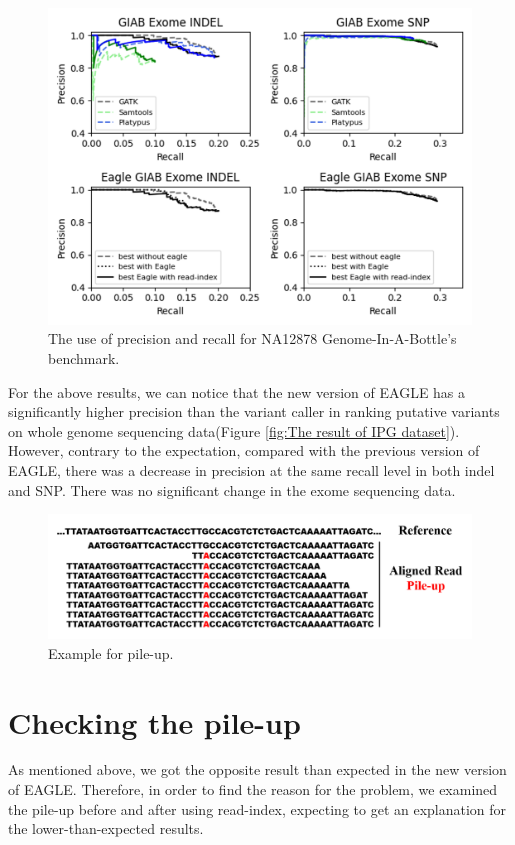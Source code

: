 \documentclass[PhD]{PHlab-thesis}
\begin{document}
\begin{figure}[h!]
	\centering
	\includegraphics[scale=0.45]{figures/GIAB result.png}
	\caption{The use of precision and recall for NA12878 Genome-In-A-Bottle’s benchmark.}
	\label{fig:The result of GIAB dataset} %
\end{figure}

For the above results, we can notice that the new version of EAGLE has a significantly higher precision than the variant caller in ranking putative variants on whole genome sequencing data(Figure \ref{fig:The result of IPG dataset}). However, contrary to the expectation, compared with the previous version of EAGLE, there was a decrease in precision at the same recall level in both indel and SNP.  There was no significant change in the exome sequencing data.

\begin{figure}[h!]
	\centering
	\includegraphics[scale=0.3]{figures/Pileup.png}
	\caption{Example for pile-up.}
	\label{fig:Example for pile-up} %
\end{figure}

\section{Checking the pile-up}
As mentioned above, we got the opposite result than expected in the new version of EAGLE.  Therefore, in order to find the reason for the problem, we examined the pile-up before and after using read-index, expecting to get an explanation for the lower-than-expected results.
\end{document}
